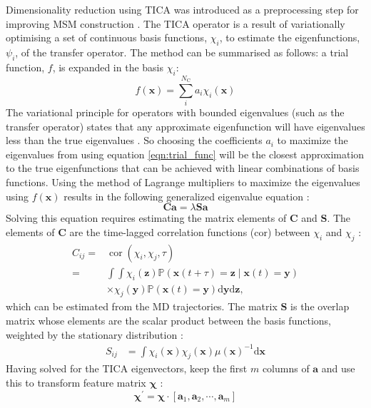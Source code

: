 Dimensionality reduction using TICA was introduced as a preprocessing step for improving MSM construction \cite{perez-hernandezIdentificationSlowMolecular2013a, schwantesImprovementsMarkovState2013}. The TICA operator is a result of variationally optimising a set of continuous basis functions, $\chi_{i}$, to estimate the eigenfunctions, $\psi_{i}$, of the transfer operator. The method can be summarised as follows: a trial function, $f$, is expanded in the basis $\chi_{i}$: 
\begin{equation}\label{eqn:trial_func}
    f(\mathbf{x}) = \sum^{N_{\mathrm{C}}}_{i}a_{i}\chi_{i}(\mathbf{x})
\end{equation}
The variational principle for operators with bounded eigenvalues (such as the transfer operator) states that any approximate eigenfunction will have eigenvalues less than the true eigenvalues \cite{noeVariationalApproachModeling2013}. So choosing the coefficients $a_{i}$ to maximize the eigenvalues from using equation \ref{eqn:trial_func} will be the closest approximation to the true eigenfunctions that can be achieved with linear combinations of basis functions. Using the method of Lagrange multipliers to maximize the eigenvalues using $f(\mathbf{x})$ results in the following generalized eigenvalue equation \cite{nuskeVariationalApproachMolecular2014}: \begin{equation}\label{eqn:general_ev_equation}
    \mathbf{C}\mathbf{a} = \lambda \mathbf{S}\mathbf{a}
\end{equation}
Solving this equation requires estimating the matrix elements of $\mathbf{C}$ and $\mathbf{S}$. The elements of $\mathbf{C}$ are the time-lagged correlation functions ($\mathrm{cor}$) between $\chi_{i}$ and $\chi_{j}$ \cite{nuskeVariationalApproachMolecular2014}:
\begin{equation}
    \begin{split}
        C_{ij} =& \operatorname{cor}\left(\chi_{i}, \chi_{j}, \tau\right)\\
        =& \int \int \chi_{i}(\mathbf{z}) \mathbb{P}\left(\mathbf{x}(t+\tau)=\mathbf{z} \mid \mathbf{x}(t)=\mathbf{y}\right) \\
        & \times \chi_{j}(\mathbf{y}) \mathbb{P}\left(\mathbf{x}(t)=\mathbf{y}\right) \mathrm{d} \mathbf{y} \mathrm{d}\mathbf{z},        
    \end{split}
\end{equation}
which can be estimated from the MD trajectories. The matrix $\mathbf{S}$ is the overlap matrix whose elements are the scalar product between the basis functions, weighted by the stationary distribution \cite{nuskeVariationalApproachMolecular2014}:
\begin{align}
    S_{ij} &= \int \chi_{i}(\mathbf{x})\chi_{j}(\mathbf{x})\mu(\mathbf{x})^{-1} \mathrm{d}\mathbf{x}
\end{align}
Having solved for the TICA eigenvectors, keep the first $m$ columns of $\mathbf{a}$ and use this to transform feature matrix $\bm{\chi}$ \cite{perez-hernandezIdentificationSlowMolecular2013a,schwantesImprovementsMarkovState2013}:
\begin{equation}
    \bm{\chi}^{\prime} = \bm{\chi}\cdot[\mathbf{a}_{1}, \mathbf{a}_{2}, \cdots,  \mathbf{a}_{m}]
\end{equation}

